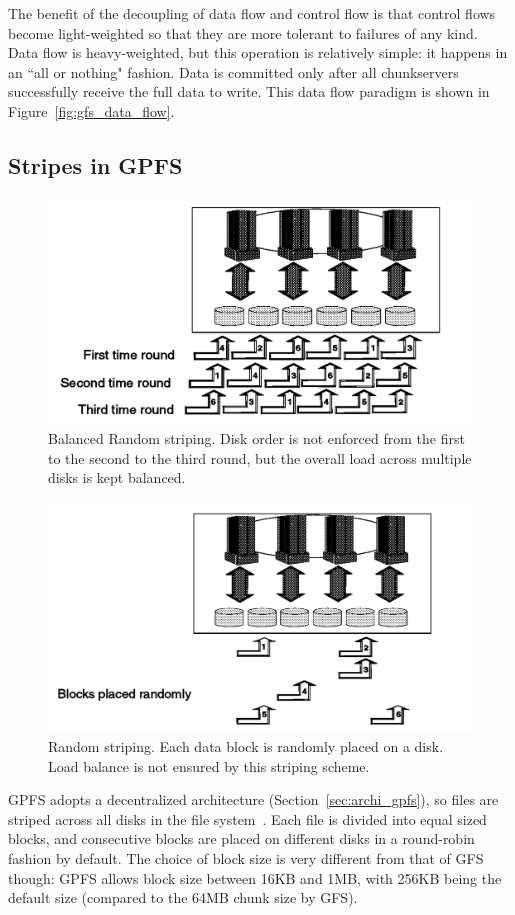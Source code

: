 The benefit of the decoupling of data flow and control flow is that control 
flows become light-weighted so that they are more tolerant to failures 
of any kind.
%
Data flow is heavy-weighted, but this operation is relatively simple:
it happens in an ``all or nothing" fashion.
%
Data is committed only after all chunkservers successfully
receive the full data to write.
%
This data flow paradigm is shown in Figure~\ref{fig:gfs_data_flow}.



\subsection{Stripes in GPFS}
\label{sec:stripe_gpfs}
%
\begin{figure}
\centering
\includegraphics[width=1\columnwidth]{image/balancedrandom.png}
\caption{Balanced Random striping. Disk order is not enforced from the 
	first to the second to the third round, but the overall load across
	multiple disks is kept balanced.}
\label{fig:balancedrandom}
\end{figure}
%
\begin{figure}
\centering
\includegraphics[width=1\columnwidth]{image/random.png}
\caption{Random striping. Each data block is randomly placed on a 
		disk. Load balance is not ensured by this striping scheme.}
\label{fig:random}
\end{figure}
%
%
GPFS adopts a decentralized architecture (Section~\ref{sec:archi_gpfs}),
so files are striped across all disks in the file 
system~\cite{Schmuck2002,barkes1998gpfs}.
%
Each file is divided into equal sized blocks, and consecutive blocks are 
placed on different disks in a round-robin fashion by default.
%
The choice of block size is very different from that of GFS though: 
GPFS allows  block size between 16KB and 1MB, with 256KB being the 
default size (compared to the 64MB chunk size by GFS).

